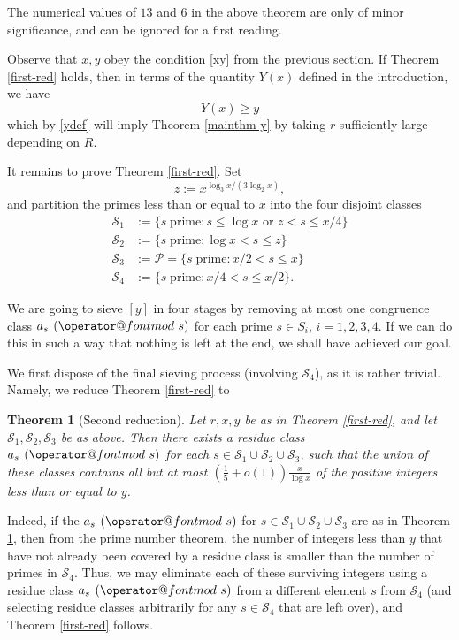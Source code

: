 \documentclass[12pt]{amsart}
\makeatletter
\numberwithin{equation}{section}  %
\theoremstyle{remark}
\theoremstyle{plain}
\newtheorem{thm}{Theorem}
\numberwithin{equation}{section}
\renewcommand{\pmod}[1]{\allowbreak\mkern7mu({\operator@font mod}\,\,#1)}
\renewcommand{\le}{\leqslant}
\renewcommand{\leq}{\leqslant}
\renewcommand{\geq}{\geqslant}
\renewcommand{\(}{\left(}
\renewcommand{\)}{\right)}
\newcommand{\PP}{\mathcal{P}}
\newcommand{\cS}{\mathcal{S}}
\makeatother
\begin{document}
The numerical values of $13$ and $6$ in the above theorem are only of minor significance, and can be ignored for a first reading.

Observe that $x,y$ obey the condition \eqref{xy} from the previous section.  If Theorem \ref{first-red} holds, then in  terms of the quantity $Y(x)$ defined in the introduction, we have
$$ Y(x) \geq y$$
which by \eqref{ydef} will imply Theorem \ref{mainthm-y} by taking $r$ sufficiently large depending on $R$.

It remains to prove Theorem \ref{first-red}.  Set
\begin{equation}\label{zdef}
 z :=x^{\log_3 x/(3\log_2 x)},
\end{equation}
and partition the primes less than or equal to $x$ into the four disjoint classes
\begin{align*}
\cS_1 &:= \{ s \; \mbox{prime} : s\le \log x \text{ or } z < s \le x/4 \}\\
\cS_2 &:= \{ s\; \mbox{prime} : \log x < s \le z \}\\
\cS_3 &:= \PP = \{ s \; \mbox{prime}: x/2 < s \leq x\}\\
\cS_4 &:= \{s \;\mbox{prime}: x/4 < s \leq x/2\}.
\end{align*}

We are going to sieve $[y]$ in four stages by removing at most one congruence class $a_s \pmod{s}$ for each prime $s \in S_i$, $i = 1,2,3,4$. If we can do this in such a way that nothing is left at the end, we shall have achieved our goal.

We first dispose of the final sieving process (involving $\cS_4$), as it is rather trivial.  Namely, we reduce Theorem \ref{first-red} to

\begin{thm}[Second reduction]\label{second-red}  Let $r,x,y$ be as in
  Theorem \ref{first-red}, and let $\cS_1,\cS_2,\cS_3$ be as above.
  Then there exists a residue class $a_s \pmod s$ for each $s \in
  \cS_1 \cup \cS_2 \cup \cS_3$, such that the union of these classes
  contains all but at most $(\frac{1}{5} + o(1)) \frac{x}{\log x}$ of the positive integers less than or equal to $y$.
\end{thm}

Indeed, if the $a_s \pmod s$ for $s \in \cS_1 \cup \cS_2 \cup \cS_3$ are as in Theorem \ref{second-red}, then from the prime number theorem, the number of integers less than $y$ that have not already been covered by a residue class is smaller than the number of primes in $\cS_4$.  Thus, we may eliminate each of these surviving integers using a residue class $a_s \pmod s$ from a different element $s$ from $\cS_4$ (and selecting residue classes arbitrarily for any $s \in \cS_4$ that are left over), and Theorem \ref{first-red} follows.
\end{document}
